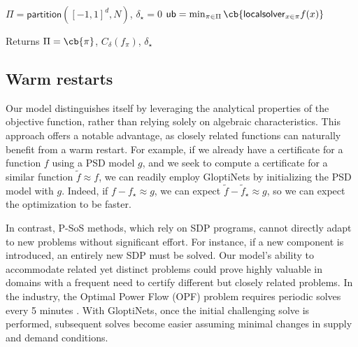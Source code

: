 \documentclass{article}
\begin{document}
\begin{algorithm}\label{alg:faster-optim}
  \caption{Splitting scheme with GloptiNets}



  $\Pi = \mathsf{partition}([-1, 1]^d, N)$, $\delta_\star = 0$ \;
   $\mathsf{ub} = \min_{\pi \in \Pi} \cb{\mathsf{localsolver}_{x \in \pi} f(x)}$\;

   

  Returns $\Pi = \cb{\pi}$, $C_\delta(f_\pi)$, $\delta_\star$\;
\end{algorithm}

\subsection{Warm restarts}

Our model distinguishes itself by leveraging the analytical properties of the objective function, rather than relying solely on algebraic characteristics. This approach offers a notable advantage, as closely related functions can naturally benefit from a warm restart. For example, if we already have a certificate for a function $f$ using a PSD model $g$, and we seek to compute a certificate for a similar function $\tilde{f} \approx f$, we can readily employ GloptiNets by initializing the PSD model with $g$. Indeed, if $f - f_\star \approx g$, we can expect $\tilde{f} - \tilde{f}_\star \approx g$, so we can expect the optimization to be faster.

In contrast, P-SoS methods, which rely on SDP programs, cannot directly adapt to new problems without significant effort. For instance, if a new component is introduced, an entirely new SDP must be solved. Our model's ability to accommodate related yet distinct problems could prove highly valuable in domains with a frequent need to certify different but closely related problems. In the industry, the Optimal Power Flow (OPF) problem requires periodic solves every 5 minutes \cite{vanhentenryckMachineLearningOptimal18}. With GloptiNets, once the initial challenging solve is performed, subsequent solves become easier assuming minimal changes in supply and demand conditions.
\end{document}
